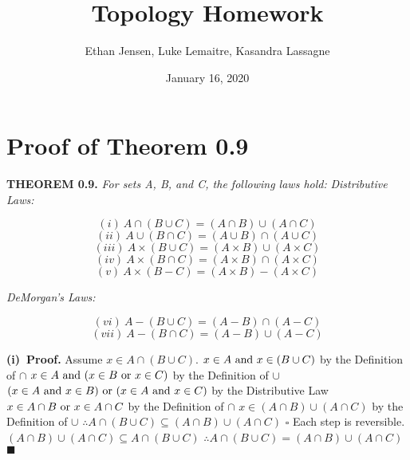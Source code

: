 \documentclass[12pt]{article}
\title{Topology Homework}
\author{Ethan Jensen, Luke Lemaitre, Kasandra Lassagne}
\date{January 16, 2020}
\begin{document}
	\maketitle
  \section[20pt]{Proof of Theorem 0.9}
	\textbf{THEOREM 0.9.} \textit{For sets A, B, and C, the following laws hold:}
	\newline
	\newline
	\textit{Distributive Laws:}
	\begin{adjustwidth}{-2cm}{0cm}
		\begin{flushleft}
		\[(i)\ A \cap (B \cup C) = (A \cap B) \cup (A \cap C) \]
		\[(ii)\ A \cup (B \cap C) = (A \cup B) \cap (A \cup C) \]
		\[(iii)\ A \times (B \cup C) = (A \times B) \cup (A \times C) \]
		\[(iv)\ A \times (B \cap C) = (A \times B) \cap (A \times C) \]
		\[(v)\ A \times (B - C) = (A \times B) - (A \times C) \]
	\end{flushleft}
	\end{adjustwidth}
	\textit{DeMorgan's Laws:}
	\begin{adjustwidth}{-2cm}{0cm}
		\[(vi)\ A - (B \cup C) = (A - B) \cap (A - C) \]
		\[(vii)\ A - (B \cap C) = (A - B) \cup (A - C) \]
	\end{adjustwidth}
	\[\ \]
	\textbf{(i)\ Proof.}
	\newline
	Assume \(x \in A \cap (B \cup C)\). \newline
	\(x \in A \textup{ and } x \in (B \cup C)\) by the Definition of \(\cap\)
	\newline
	\(x \in A \textup{ and } (x \in B \textup{ or } x \in C)\) by the Definition of \(\cup\)
	\newline
	\((x \in A \textup{ and } x \in B) \textup{ or } (x \in A \textup{ and } x \in C)\) by the Distributive Law
	\newline
	\(x \in A \cap B \textup{ or } x \in A \cap C\) by the Definition of \(\cap\)
	\newline
	\(x \in (A \cap B) \cup (A \cap C)\) by the Definition of \(\cup\)
	\newline
	\(\therefore A \cap (B \cup C) \subseteq (A \cap B) \cup (A \cap C)\)
	\newline \(\square\) \newline
	Each step is reversible.
	\newline
	\((A \cap B) \cup (A \cap C) \subseteq A \cap (B \cup C)\)
	\newline
	\(\therefore A \cap (B \cup C) = (A \cap B) \cup (A \cap C)\)
	\newline \(\blacksquare\)
	\newpage
\end{document}
